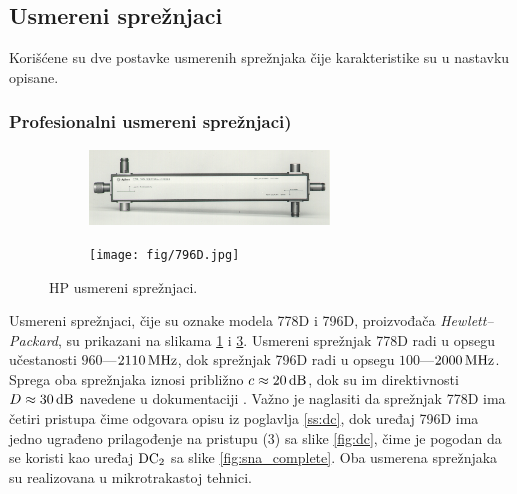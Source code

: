 \documentclass[a4paper, 12pt, diplomski]{etf}
\newcommand{\unit}[1]{\,{\rm #1}}
\begin{document}
\subsection{Usmereni sprežnjaci}
Korišćene su dve postavke usmerenih sprežnjaka čije 
karakteristike su u nastavku opisane.

\subsubsection{Profesionalni usmereni sprežnjaci)
\label{ss:hp}}
\begin{figure}[b!]
    \hfill
    \begin{subfigure}[b]{0.49\textwidth}
        \centering
        \includegraphics[angle=90, width=0.7\textwidth]{fig/778D.jpg}
        \label{fig:778d}
    \end{subfigure}
    \hfill
    \begin{subfigure}[b]{0.49\textwidth}
        \centering
        \texttt{[image: fig/796D.jpg]}
        \label{fig:796d}
    \end{subfigure}
    \hfill
    \caption{HP usmereni sprežnjaci.}
\end{figure}

Usmereni sprežnjaci, čije su oznake modela 778D i 796D,
proizvođača \textit{Hewlett--Packard},
su prikazani na slikama \ref{fig:778d} i \ref{fig:796d}.
Usmereni sprežnjak 778D
radi u opsegu učestanosti $960$---$2110\unit{MHz}$, dok 
sprežnjak 796D radi u opsegu  $100$---$2000\unit{MHz}$.
Sprega oba sprežnjaka iznosi približno $c \approx 
20\unit{dB}$, dok su im direktivnosti 
$D \approx 30\unit{dB}$ navedene u dokumentaciji
\cite{datasheet778d, datasheet796d}. 
Važno je naglasiti da sprežnjak 778D
ima četiri pristupa čime odgovara opisu 
iz poglavlja \ref{ss:dc}, dok uređaj 796D
ima jedno ugrađeno prilagođenje na pristupu 
(3) sa slike \ref{fig:dc}, čime je pogodan
da se koristi kao uređaj $\rm DC_2$ sa slike
\ref{fig:sna_complete}.
Oba usmerena sprežnjaka su realizovana u 
mikrotrakastoj tehnici. 

%
\end{document}

